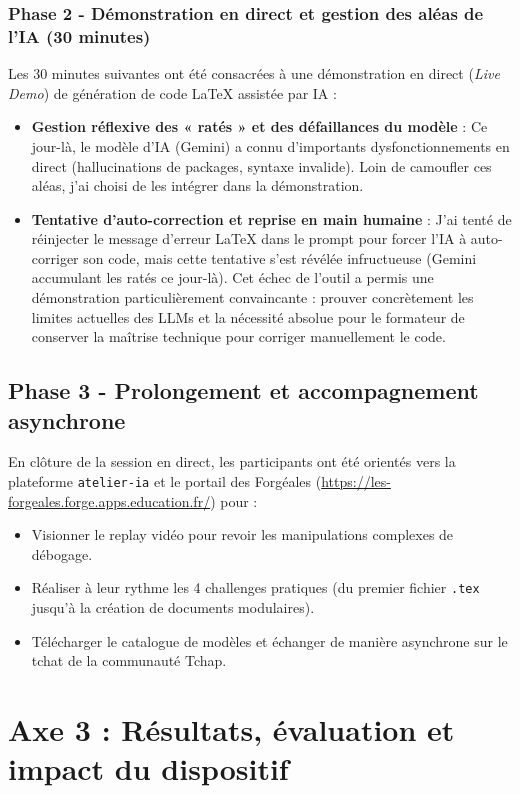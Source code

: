 \subsubsection{Phase 2 - Démonstration en direct et gestion des aléas de l'IA (30 minutes)}

Les 30 minutes suivantes ont été consacrées à une démonstration en direct (\textit{Live Demo}) de génération de code \LaTeX{} assistée par IA :
\begin{itemize}[leftmargin=*]
    \item \textbf{Gestion réflexive des « ratés » et des défaillances du modèle} : Ce jour-là, le modèle d'IA (Gemini) a connu d'importants dysfonctionnements en direct (hallucinations de packages, syntaxe invalide). Loin de camoufler ces aléas, j'ai choisi de les intégrer dans la démonstration.
    \item \textbf{Tentative d'auto-correction et reprise en main humaine} : J'ai tenté de réinjecter le message d'erreur \LaTeX{} dans le prompt pour forcer l'IA à auto-corriger son code, mais cette tentative s'est révélée infructueuse (Gemini accumulant les ratés ce jour-là). Cet échec de l'outil a permis une démonstration particulièrement convaincante : prouver concrètement les limites actuelles des LLMs et la nécessité absolue pour le formateur de conserver la maîtrise technique pour corriger manuellement le code.
\end{itemize}

\subsection{Phase 3 - Prolongement et accompagnement asynchrone}

En clôture de la session en direct, les participants ont été orientés vers la plateforme \texttt{atelier-ia} et le portail des Forgéales (\url{https://les-forgeales.forge.apps.education.fr/}) pour :
\begin{itemize}[leftmargin=*]
    \item Visionner le replay vidéo pour revoir les manipulations complexes de débogage.
    \item Réaliser à leur rythme les 4 challenges pratiques (du premier fichier \texttt{.tex} jusqu'à la création de documents modulaires).
    \item Télécharger le catalogue de modèles et échanger de manière asynchrone sur le tchat de la communauté Tchap.
\end{itemize}

\section{Axe 3 : Résultats, évaluation et impact du dispositif}

